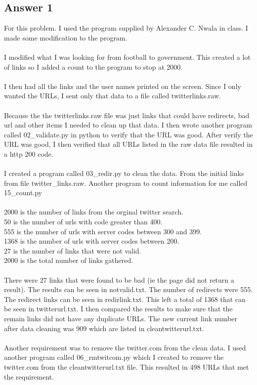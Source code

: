 \documentclass[10pt,letterpaper]{article}
\begin{document}
\subsection{Answer 1}

For this problem.  I used the program supplied by Alexander C. Nwala in class.  I made some modification to the program.\\
\\
I modified what I was looking for from football to government.  This created a lot of links so I added a count to the program to stop at 2000.\\
\\
I then had all the links and the user names printed on the screen.  Since I only wanted the URLs, I sent only that data to a file called twitterlinks.raw.\\ 
\\
Because the the twitterlinks.raw file was just links that could have redirects, bad url and other items I needed to clean up that data.  I then wrote another program called 02\_validate.py in python to verify that the URL was good.  After verify the URL was good, I then verified that all URLs listed in the raw data file resulted in a http 200 code.\\
\\
I created a program called 03\_redir.py to clean the data.  From the initial links from file twitter\_links.raw. Another program to count information for me called 15\_count.py\\  
\\
2000 is the number of links from the orginal twitter search.\\
50 is the number of urls with code greater than 400.\\
555 is the number of urls with server codes between 300 and 399.\\
1368 is the number of urls with server codes between 200.\\
27 is the number of links that were not valid.\\
2000 is the total number of links gathered.\\
\\
There were 27 links that were found to be bad (ie the page did not return a result).  The results can be seen in notvalid.txt.  The number of redirects were 555.  The redirect links can be seen in redirlink.txt.  This left a total of 1368 that can be seen in twitterurl.txt.  I then compared the results to make sure that the remain links did not have any duplicate URLs.  The new current link number after data cleaning was 909 which are listed in cleantwitterurl.txt.\\
\\
Another requirement was to remove the twitter.com from the clean data.  I used another program called 06\_rmtwitcom.py which I created to remove the twitter.com from the cleantwitterurl.txt file.  This resulted in 498 URLs that met the requirement.\\
\pagebreak %
\end{document}

